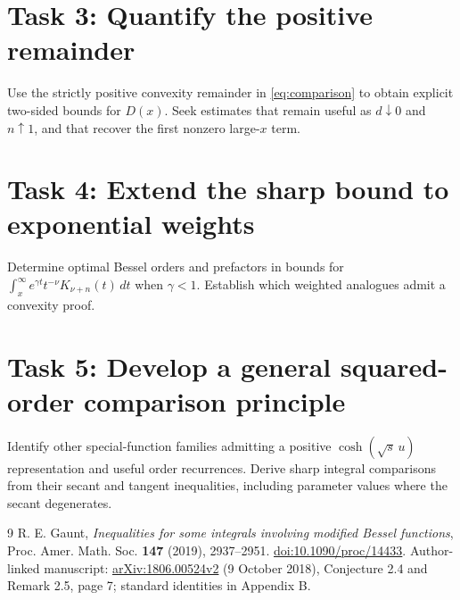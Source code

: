\documentclass[11pt]{article}
\begin{document}
\section*{Task 3: Quantify the positive remainder}
Use the strictly positive convexity remainder in
\eqref{eq:comparison} to obtain explicit two-sided bounds for $D(x)$.
Seek estimates that remain useful as $d\downarrow0$ and $n\uparrow1$,
and that recover the first nonzero large-$x$ term.

\section*{Task 4: Extend the sharp bound to exponential weights}
Determine optimal Bessel orders and prefactors in bounds for
$\int_x^\infty e^{\gamma t}t^{-\nu}K_{\nu+n}(t)\,dt$ when $\gamma<1$.
Establish which weighted analogues admit a convexity proof.

\section*{Task 5: Develop a general squared-order comparison principle}
Identify other special-function families admitting a positive
$\cosh(\sqrt{s}\,u)$ representation and useful order recurrences.
Derive sharp integral comparisons from their secant and tangent
inequalities, including parameter values where the secant degenerates.

\begin{thebibliography}{9}
 R. E. Gaunt,
\emph{Inequalities for some integrals involving modified Bessel functions},
Proc. Amer. Math. Soc. \textbf{147} (2019), 2937--2951.
\href{https://doi.org/10.1090/proc/14433}{doi:10.1090/proc/14433}.
Author-linked manuscript:
\href{https://arxiv.org/abs/1806.00524}{arXiv:1806.00524v2} (9 October 2018),
Conjecture 2.4 and Remark 2.5, page 7; standard identities in Appendix B.
\end{thebibliography}
\end{document}
